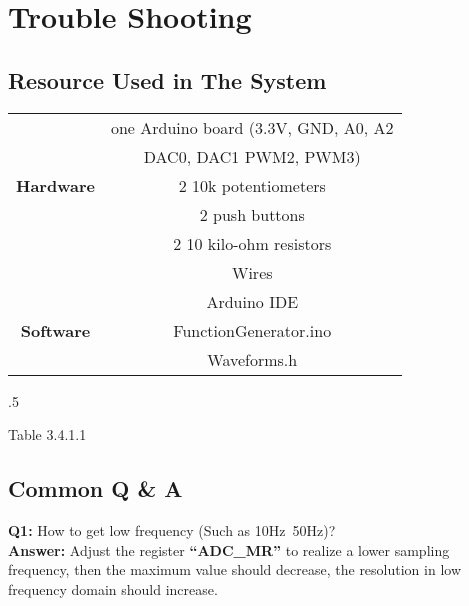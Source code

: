 \documentclass[12pt]{report}
\begin{document}
\section{\large Trouble Shooting}

\subsection{Resource Used in The System}
\begin{center}
    \begin{tabular}{||c|c||} \hline
      \ & one Arduino board (3.3V, GND, A0, A2\\ & DAC0, DAC1 PWM2, PWM3)\\ \textbf{Hardware} & 2 10k potentiometers\\ & 2 push buttons\\ & 2 10 kilo-ohm resistors\\ & Wires\\ \hline
      \ & Arduino IDE\\ \textbf{Software} & FunctionGenerator.ino\\ & Waveforms.h\\ \hline
    \end{tabular}
  \end{center}
  \moveleft.5\hoffset\centerline{\footnotesize Table 3.4.1.1}
\subsection{Common Q \& A}
\begin{flushleft}
\textbf{Q1: }
\textup{How to get low frequency (Such as 10Hz~50Hz)?\\}
\vspace{5pt}
\textbf{Answer:}
Adjust the register \textbf{``ADC\_MR''} to realize a lower sampling frequency, then the maximum value should decrease, the resolution in low frequency domain should increase.
\end{flushleft}
\end{document}
